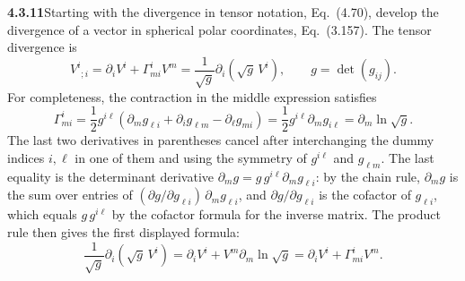 \par\bigskip
\noindent\textbf{4.3.11}\quad Starting with the divergence in tensor notation,
Eq.~(4.70), develop the divergence of a vector in spherical polar coordinates,
Eq.~(3.157).
\solution
The tensor divergence is
\[
V^i{}_{;i}=\partial_iV^i+\Gamma^i_{mi}V^m
=\frac1{\sqrt g}\partial_i(\sqrt g\,V^i),
\qquad g=\det(g_{ij}).
\]
For completeness, the contraction in the middle expression satisfies
\[
\Gamma^i_{mi}=\frac12g^{i\ell}
 (\partial_mg_{\ell i}+\partial_i g_{\ell m}-\partial_\ell g_{mi})
=\frac12g^{i\ell}\partial_mg_{i\ell}
=\partial_m\ln\sqrt g.
\]
The last two derivatives in parentheses cancel after interchanging the
dummy indices $i,\ell$ in one of them and using the symmetry of
$g^{i\ell}$ and $g_{\ell m}$. The last equality is the determinant
derivative $\partial_mg=g\,g^{i\ell}\partial_mg_{\ell i}$: by the chain
rule, $\partial_mg$ is the sum over entries of
$(\partial g/\partial g_{\ell i})\,\partial_mg_{\ell i}$, and
$\partial g/\partial g_{\ell i}$ is the cofactor of $g_{\ell i}$, which
equals $g\,g^{i\ell}$ by the cofactor formula for the inverse matrix.
The product rule then gives the first displayed formula:
\[
\frac1{\sqrt g}\partial_i(\sqrt g\,V^i)
=\partial_iV^i+V^m\partial_m\ln\sqrt g
=\partial_iV^i+\Gamma^i_{mi}V^m.
\]

